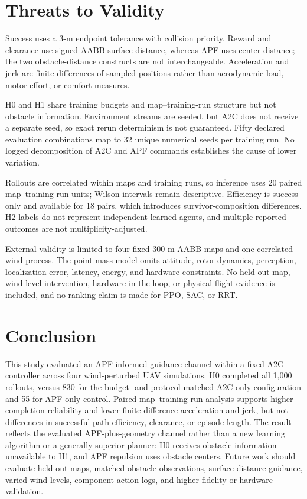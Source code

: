 \documentclass[conference]{IEEEtran}
\begin{document}
\section{Threats to Validity}
Success uses a 3-m endpoint tolerance with collision priority. Reward and clearance use signed AABB surface distance, whereas APF uses center distance; the two obstacle-distance constructs are not interchangeable. Acceleration and jerk are finite differences of sampled positions rather than aerodynamic load, motor effort, or comfort measures.

H0 and H1 share training budgets and map--training-run structure but not obstacle information. Environment streams are seeded, but A2C does not receive a separate seed, so exact rerun determinism is not guaranteed. Fifty declared evaluation combinations map to 32 unique numerical seeds per training run. No logged decomposition of A2C and APF commands establishes the cause of lower variation.

Rollouts are correlated within maps and training runs, so inference uses 20 paired map--training-run units; Wilson intervals remain descriptive. Efficiency is success-only and available for 18 pairs, which introduces survivor-composition differences. H2 labels do not represent independent learned agents, and multiple reported outcomes are not multiplicity-adjusted.

External validity is limited to four fixed 300-m AABB maps and one correlated wind process. The point-mass model omits attitude, rotor dynamics, perception, localization error, latency, energy, and hardware constraints. No held-out-map, wind-level intervention, hardware-in-the-loop, or physical-flight evidence is included, and no ranking claim is made for PPO, SAC, or RRT.

\section{Conclusion}
This study evaluated an APF-informed guidance channel within a fixed A2C controller across four wind-perturbed UAV simulations. H0 completed all 1,000 rollouts, versus 830 for the budget- and protocol-matched A2C-only configuration and 55 for APF-only control. Paired map--training-run analysis supports higher completion reliability and lower finite-difference acceleration and jerk, but not differences in successful-path efficiency, clearance, or episode length. The result reflects the evaluated APF-plus-geometry channel rather than a new learning algorithm or a generally superior planner: H0 receives obstacle information unavailable to H1, and APF repulsion uses obstacle centers. Future work should evaluate held-out maps, matched obstacle observations, surface-distance guidance, varied wind levels, component-action logs, and higher-fidelity or hardware validation.
\end{document}
